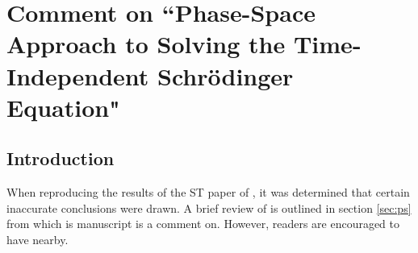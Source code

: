 %






%




\chapter{Comment on ``Phase-Space Approach to Solving the Time-Independent Schr\"{o}dinger Equation"}\label{ch:PRL}

\section{Introduction}
When reproducing the results of the ST paper of , it was determined that certain inaccurate conclusions were drawn. A brief review of  is outlined in section \ref{sec:ps} from which is manuscript is a comment on. However, readers are encouraged to have  nearby. 

